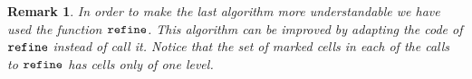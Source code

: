 \documentclass[a4paper]{siamltex1213}
\newtheorem{remark}[theorem]{Remark}
\newcommand{\note}[1]{{\noindent\centerline{\fbox{\parbox{.9\textwidth}{\textbf{
#1}}}}}}
\DeclareMathOperator\mesh{\texttt{MESH}}
\DeclareMathOperator\basis{\texttt{SPACE}}
\DeclareMathOperator\marked{\tt MARKED}
\newcommand\BB{\mathcal B}
\newcommand\QQ{\mathcal Q}
\let\hat\widehat
\begin{document}













\begin{remark}
 In order to make the last algorithm more understandable we have used the function $\verb+refine+$. This algorithm can be improved by adapting the code of $\verb+refine+$ instead of call it. Notice that the set of marked cells in each of the calls to $\verb+refine+$ has cells only of one level. 
\end{remark}


\end{document}
